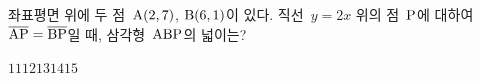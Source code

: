 좌표평면 위에 두 점~$\mathrm{A}(2{,}\mkern3mu 7)$, $\mathrm{B}(6{,}\mkern3mu 1)$이 있다. 직선~$y=2x$ 위의 점~$\mathrm{P}$에 대하여 $\overline{\mathrm{AP}}=\overline{\mathrm{BP}}$일 때, 삼각형~$\mathrm{ABP}$의 넓이는?
\begin{choices32}{$11$}{$12$}{$13$}{$14$}{$15$}\end{choices32}
